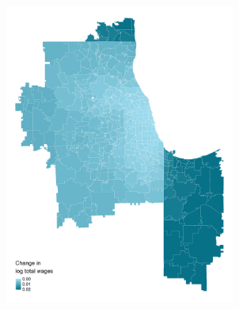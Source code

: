 \documentclass[aspectratio=169, t]{beamer}
\begin{document}
\begin{frame}[label = changes_rents_inc]
\begin{figure}
\begin{subfigure}{0.5\textwidth}
            \includegraphics[width = 0.83\textwidth]{counterfactuals/output/chicago_d_ln_wagebill.png}
        \end{subfigure}
    \end{figure}
    
    \vspace{-1.5mm}
    \centering
    \hyperlink{share_pocketed}{}
\end{frame}
\end{document}
